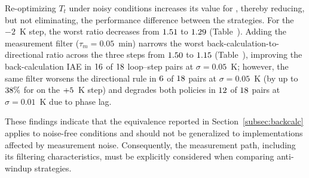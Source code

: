 Re-optimizing $T_t$ under noisy conditions increases its value for \vnzttchanged{}, thereby reducing, but not eliminating, the performance difference between the strategies. For the $-2$~K step, the worst ratio decreases from $1.51$ to $1.29$ (Table~). Adding the measurement filter ($\tau_m = 0.05$~min) narrows the worst back-calculation-to-directional ratio across the three steps from $1.50$ to $1.15$ (Table~), improving the back-calculation IAE in $16$ of $18$ loop--step pairs at $\sigma = 0.05$~K; however, the same filter worsens the directional rule in $6$ of $18$ pairs at $\sigma = 0.05$~K (by up to $38\%$ for \vfiltdirworstloop{} on the $+5$~K step) and degrades both policies in $12$ of $18$ pairs at $\sigma = 0.01$~K due to phase lag.

These findings indicate that the equivalence reported in Section~\ref{subsec:backcalc} applies to noise-free conditions and should not be generalized to implementations affected by measurement noise. Consequently, the measurement path, including its filtering characteristics, must be explicitly considered when comparing anti-windup strategies.

